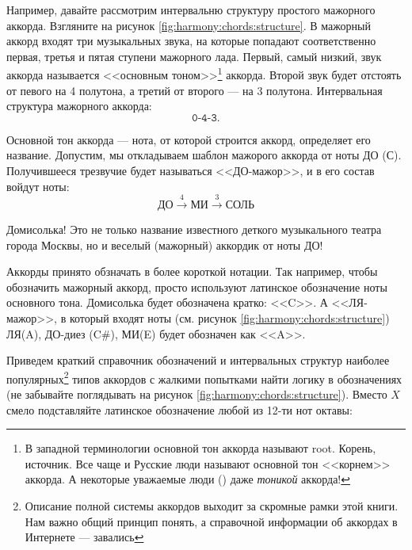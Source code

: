 Например, давайте рассмотрим интервальню структуру простого мажорного аккорда. Взгляните на рисунок \ref{fig:harmony:chords:structure}. В мажорный аккорд входят три музыкальных звука, на которые попадают соответственно первая, третья и пятая ступени мажорного лада. Первый, самый низкий, звук аккорда называется <<основным тоном>>\footnote{В западной терминологии основной тон аккорда называют root. Корень, источник. Все чаще и Русские люди называют основной тон <<корнем>> аккорда. А некоторые уважаемые люди (\cite{url:pimalive}) даже \emph{тоникой} аккорда!} аккорда. Второй звук будет отстоять от певого на 4 полутона, а третий от второго --- на 3 полутона. Интервальная структура мажорного аккорда:
\[
    \texttt{0-4-3}.
\]

Основной тон аккорда --- нота, от которой строится аккорд, определяет его название. Допустим, мы откладываем шаблон мажорого аккорда от ноты ДО (С). Получившееся трезвучие будет называться <<ДО-мажор>>, и в его состав войдут ноты: 
\[
    \text{ДО}\xrightarrow{4}
    \text{МИ}\xrightarrow{3}
    \text{СОЛЬ}
\]

Домисолька! Это не только название известного деткого музыкального театра города Москвы, но и веселый (мажорный) аккордик от ноты ДО! 

Аккорды принято обзначать в более короткой нотации. Так например, чтобы обозначить мажорный аккорд, просто используют латинское обозначение ноты основного тона. Домисолька будет обозначена кратко: <<C>>. А <<ЛЯ-мажор>>, в который входят ноты (см. рисунок \ref{fig:harmony:chords:structure}) ЛЯ(A), ДО-диез (C\#), МИ(E) будет обозначен как <<A>>.

Приведем краткий справочник обозначений и интервальных структур наиболее популярных\footnote{Описание полной системы аккордов выходит за скромные рамки этой книги. Нам важно общий принцип понять, а справочной информации об аккордах в Интернете --- завались} типов аккордов с жалкими попытками найти логику в обозначениях (не забывайте поглядывать на рисунок \ref{fig:harmony:chords:structure}). Вместо $X$ смело подставляйте латинское обозначение любой из 12-ти нот октавы:

